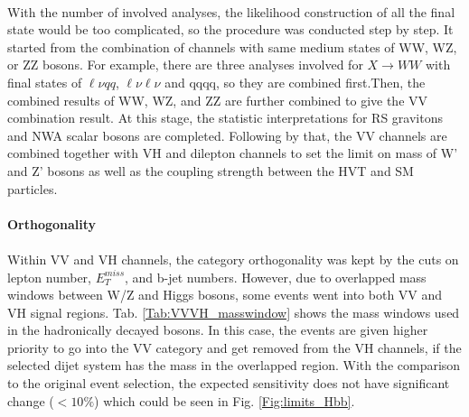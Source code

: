 \noindent
\\With the number of involved analyses, the likelihood construction of all the final state would be too complicated, so the procedure was conducted step by step. It started from the combination of channels with same medium states of WW, WZ, or ZZ bosons. For example, there are three analyses involved for $X\to WW$ with final states of $\ell\nu qq$, $\ell\nu\ell\nu$ and qqqq, so they are combined first.Then, the combined results of WW, WZ, and ZZ are further combined to give the VV combination result. At this stage, the statistic interpretations for RS gravitons and NWA scalar bosons are completed. Following by that, the VV channels are combined together with VH and dilepton channels to set the limit on mass of W' and Z' bosons as well as the coupling strength between the HVT and SM particles.  
\\
\\{\bf Orthogonality }
\\
\\Within VV and VH channels, the category orthogonality was kept by the cuts on lepton number, $E^{miss}_T$, and b-jet numbers. However, due to overlapped mass windows between W/Z and Higgs bosons, some events went into both VV and VH signal regions. Tab. \ref{Tab:VVVH_masswindow} shows the mass windows used in the hadronically decayed bosons. In this case, the events are given higher priority to go into the VV category and get removed from the VH channels, if the selected dijet system has the mass in the overlapped region. With the comparison to the original event selection, the expected sensitivity does not have significant change ($<10\%$) which could be seen in Fig. \ref{Fig:limits_Hbb}. 
